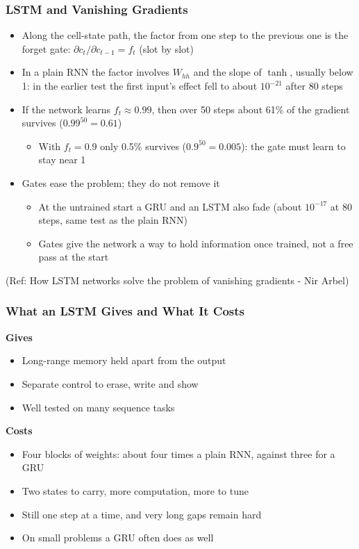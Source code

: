 \begin{frame}[fragile] \frametitle{LSTM and Vanishing Gradients}
\begin{itemize}
\item Along the cell-state path, the factor from one step to the previous one is the forget gate: $\partial c_t / \partial c_{t-1} = f_t$ (slot by slot)
\item In a plain RNN the factor involves $W_{hh}$ and the slope of $\tanh$, usually below 1: in the earlier test the first input's effect fell to about $10^{-21}$ after 80 steps
\item If the network learns $f_t \approx 0.99$, then over 50 steps about 61\% of the gradient survives ($0.99^{50} = 0.61$)
  \begin{itemize}
  \item With $f_t = 0.9$ only 0.5\% survives ($0.9^{50} = 0.005$): the gate must learn to stay near 1
  \end{itemize}
\item Gates ease the problem; they do not remove it
  \begin{itemize}
  \item At the untrained start a GRU and an LSTM also fade (about $10^{-17}$ at 80 steps, same test as the plain RNN)
  \item Gates give the network a way to hold information once trained, not a free pass at the start
  \end{itemize}
\end{itemize}

{\tiny (Ref: How LSTM networks solve the problem of vanishing gradients
- Nir Arbel)}

\end{frame}


\begin{frame}[fragile] \frametitle{What an LSTM Gives and What It Costs}
\textbf{Gives}
\begin{itemize}
\item Long-range memory held apart from the output
\item Separate control to erase, write and show
\item Well tested on many sequence tasks
\end{itemize}
\textbf{Costs}
\begin{itemize}
\item Four blocks of weights: about four times a plain RNN, against three for a GRU
\item Two states to carry, more computation, more to tune
\item Still one step at a time, and very long gaps remain hard
\item On small problems a GRU often does as well
\end{itemize}
\end{frame}


